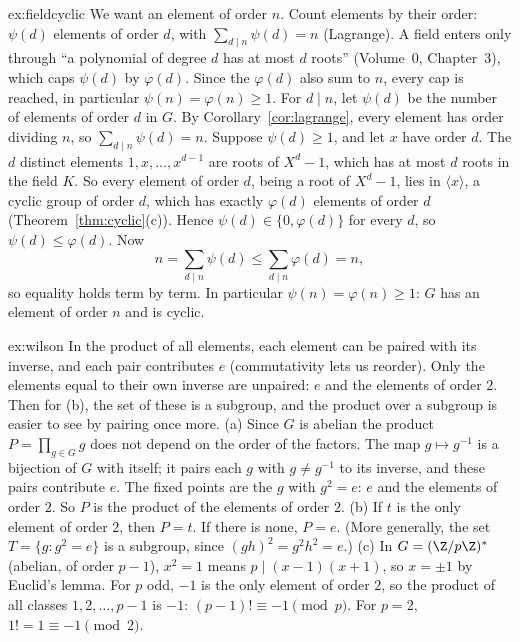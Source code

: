 \begin{solution}{ex:fieldcyclic}
\idea We want an element of order $n$. Count elements by their order: $\psi(d)$ elements of order $d$, with $\sum_{d\mid n}\psi(d)=n$ (Lagrange). A field enters only through ``a polynomial of degree $d$ has at most $d$ roots'' (Volume~0, Chapter~3), which caps $\psi(d)$ by $\varphi(d)$. Since the $\varphi(d)$ also sum to $n$, every cap is reached, in particular $\psi(n)=\varphi(n)\ge1$.
\writeup For $d\mid n$, let $\psi(d)$ be the number of elements of order $d$ in $G$. By Corollary~\ref{cor:lagrange}, every element has order dividing $n$, so $\sum_{d\mid n}\psi(d)=n$.
Suppose $\psi(d)\ge1$, and let $x$ have order $d$. The $d$ distinct elements $1,x,\dots,x^{d-1}$ are roots of $X^d-1$, which has at most $d$ roots in the field $K$. So every element of order $d$, being a root of $X^d-1$, lies in $\langle x\rangle$, a cyclic group of order $d$, which has exactly $\varphi(d)$ elements of order $d$ (Theorem~\ref{thm:cyclic}(c)). Hence $\psi(d)\in\{0,\varphi(d)\}$ for every $d$, so $\psi(d)\le\varphi(d)$. Now
\[
n=\sum_{d\mid n}\psi(d)\le\sum_{d\mid n}\varphi(d)=n,
\]
so equality holds term by term. In particular $\psi(n)=\varphi(n)\ge1$: $G$ has an element of order $n$ and is cyclic.
\end{solution}

\begin{solution}{ex:wilson}
\idea In the product of all elements, each element can be paired with its inverse, and each pair contributes $e$ (commutativity lets us reorder). Only the elements equal to their own inverse are unpaired: $e$ and the elements of order $2$. Then for (b), the set of these is a subgroup, and the product over a subgroup is easier to see by pairing once more.
\writeup (a) Since $G$ is abelian the product $P=\prod_{g\in G}g$ does not depend on the order of the factors. The map $g\mapsto g^{-1}$ is a bijection of $G$ with itself; it pairs each $g$ with $g\ne g^{-1}$ to its inverse, and these pairs contribute $e$. The fixed points are the $g$ with $g^2=e$: $e$ and the elements of order $2$. So $P$ is the product of the elements of order $2$.
(b) If $t$ is the only element of order $2$, then $P=t$. If there is none, $P=e$. (More generally, the set $T=\{g:g^2=e\}$ is a subgroup, since $(gh)^2=g^2h^2=e$.)
(c) In $G=(\Z/p\Z)^*$ (abelian, of order $p-1$), $x^2=1$ means $p\mid(x-1)(x+1)$, so $x=\pm1$ by Euclid's lemma. For $p$ odd, $-1$ is the only element of order $2$, so the product of all classes $1,2,\dots,p-1$ is $-1$: $(p-1)!\equiv-1\pmod p$. For $p=2$, $1!=1\equiv-1\pmod 2$.
\end{solution}

